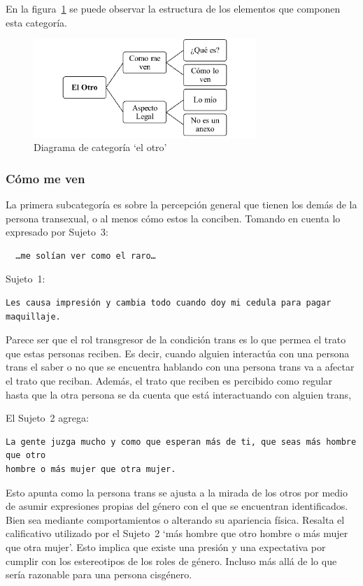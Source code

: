 En la figura~\ref{fig:otro} se puede observar la estructura de los elementos que
componen esta categoría.

\begin{figure}
    \centering
    \includegraphics[width=0.75\textwidth]{otro}
    \caption{Diagrama de categoría ‘el otro’}\label{fig:otro}
\end{figure}

\subsubsection{Cómo me ven}

La primera subcategoría es sobre la percepción general que tienen los demás de
la persona transexual, o al menos cómo estos la conciben. Tomando en cuenta lo
expresado por Sujeto~3:

\begin{verbatim}
  …me solían ver como el raro…
\end{verbatim}

Sujeto~1:

\begin{verbatim}
Les causa impresión y cambia todo cuando doy mi cedula para pagar maquillaje.
\end{verbatim}

Parece ser que el rol transgresor de la condición trans es lo que permea el
trato que estas personas reciben. Es decir, cuando alguien interactúa con una
persona trans el saber o no que se encuentra hablando con una persona trans va a
afectar el trato que reciban. Además, el trato que reciben es percibido como
regular hasta que la otra persona se da cuenta que está interactuando con
alguien trans,

El Sujeto~2 agrega:

\begin{verbatim}
La gente juzga mucho y como que esperan más de ti, que seas más hombre que otro
hombre o más mujer que otra mujer.
\end{verbatim}

Esto apunta como la persona trans se ajusta a la mirada de los otros por medio
de asumir expresiones propias del género con el que se encuentran identificados.
Bien sea mediante comportamientos o alterando su apariencia física. Resalta el
calificativo utilizado por el Sujeto~2 ‘más hombre que otro hombre o más mujer
que otra mujer’. Esto implica que existe una presión y una expectativa por
cumplir con los estereotipos de los roles de género. Incluso más allá de lo que
sería razonable para una persona cisgénero.

